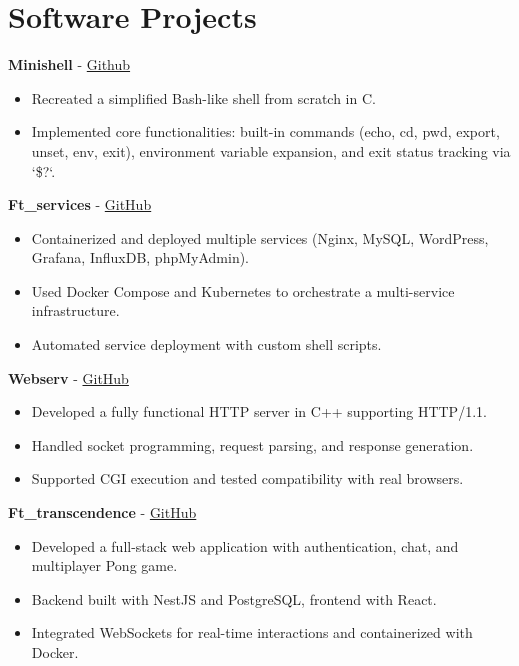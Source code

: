 \documentclass[a4paper,11pt]{article}%
\begin{document}
\section*{Software Projects}%
%
\noindent \textbf{Minishell} - \href{https://github.com/sboof911/minishell}{Github}%
\begin{itemize}[leftmargin=2em,label={},parsep=0pt,topsep=1em]%
\item Recreated a simplified Bash-like shell from scratch in C.%
\item Implemented core functionalities: built-in commands (echo, cd, pwd, export, unset, env, exit), environment variable expansion, and exit status tracking via `\$?`.%
\end{itemize}%
%
\noindent \textbf{Ft\_services} - \href{https://github.com/sboof911/ft_services}{GitHub}%
\begin{itemize}[leftmargin=2em,label={},parsep=0pt,topsep=1em]%
\item Containerized and deployed multiple services (Nginx, MySQL, WordPress, Grafana, InfluxDB, phpMyAdmin).%
\item Used Docker Compose and Kubernetes to orchestrate a multi-service infrastructure.%
\item Automated service deployment with custom shell scripts.%
\end{itemize}%
%
\noindent \textbf{Webserv} - \href{https://github.com/sboof911/webserv}{GitHub}%
\begin{itemize}[leftmargin=2em,label={},parsep=0pt,topsep=1em]%
\item Developed a fully functional HTTP server in C++ supporting HTTP/1.1.%
\item Handled socket programming, request parsing, and response generation.%
\item Supported CGI execution and tested compatibility with real browsers.%
\end{itemize}%
%
\noindent \textbf{Ft\_transcendence} - \href{https://github.com/sboof911/ft_transcendence}{GitHub}%
\begin{itemize}[leftmargin=2em,label={},parsep=0pt,topsep=1em]%
\item Developed a full-stack web application with authentication, chat, and multiplayer Pong game.%
\item Backend built with NestJS and PostgreSQL, frontend with React.%
\item Integrated WebSockets for real-time interactions and containerized with Docker.%
\end{itemize}%
\end{document}
